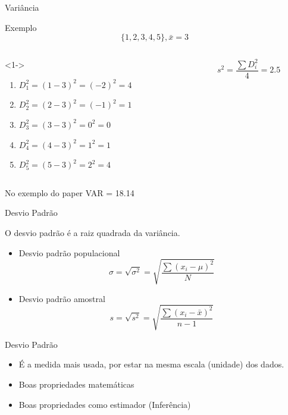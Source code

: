 \documentclass{beamer}
\begin{document}
\begin{frame}{Variância}
  \begin{exampleblock}{Exemplo}
      \begin{displaymath}
    \{1,2,3,4,5\}, \bar{x} = 3
  \end{displaymath}
  \begin{columns}
    \begin{column}{6cm}<1->
      \begin{enumerate}
      \item $D_1^2 = (1-3)^2 = (-2)^2 = 4$
      \item $D_2^2 = (2-3)^2 = (-1)^2 = 1$
      \item $D_3^2 = (3-3)^2 = 0^2 =0$
      \item $D_4^2 = (4-3)^2 = 1^2 = 1$
      \item $D_5^2 = (5-3)^2 = 2^2 = 4 $
      \end{enumerate}
    \end{column}
    \begin{column}{4cm}
      \begin{displaymath}
        s^2 = \frac{\sum D_i^2}{4} = 2.5
      \end{displaymath}
    \end{column}
  \end{columns}
  \end{exampleblock}
  \begin{block}{No exemplo do paper}
    VAR = 18.14
  \end{block}
\end{frame}

\begin{frame}{Desvio Padrão}
  \begin{definition}
    O desvio padrão é a raiz quadrada da variância.
  \end{definition}
  \begin{itemize}
  \item Desvio padrão populacional
    $$ \sigma = \sqrt{ \sigma^2 } = \sqrt{ \frac{\sum (x_i - \mu)^2}{N} } $$
  \item Desvio padrão amostral
    $$ s = \sqrt{s^2 } = \sqrt{ \frac{\sum (x_i - \bar{x})^2}{n-1} } $$
  \end{itemize}
\end{frame}

\begin{frame}{Desvio Padrão}
  \begin{itemize}
  \item É a medida mais usada, por estar na mesma escala (unidade) dos
    dados.
  \item Boas propriedades matemáticas
  \item Boas propriedades como estimador (Inferência)
  \end{itemize}
\end{frame}
\end{document}
